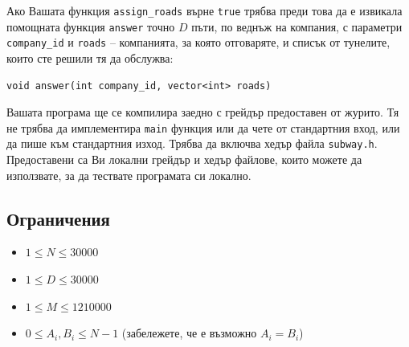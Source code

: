 \documentclass[12pt]{article}
\begin{document}
Ако Вашата функция \verb|assign_roads| върне \verb|true| трябва преди това да е извикала помощната функция \verb|answer| точно $D$ пъти, по веднъж на компания, с параметри \verb|company_id| и \verb|roads| -- компанията, за която отговаряте, и списък от тунелите, които сте решили тя да обслужва:

\begin{verbatim}
void answer(int company_id, vector<int> roads)
\end{verbatim}

Вашата програма ще се компилира заедно с грейдър предоставен от журито. Тя не трябва да имплементира \verb|main| функция или да чете от стандартния вход, или да пише към стандартния изход. Трябва да включва хедър файла \verb|subway.h|. Предоставени са Ви локални грейдър и хедър файлове, които можете да използвате, за да тествате програмата си локално.

\subsection{Ограничения}
\begin{itemize}
\item $1 \leq N \leq 30000$
\item $1 \leq D \leq 30000$
\item $1 \leq M \leq 1210000$
\item $0 \leq A_i, B_i \leq N - 1$ (забележете, че е възможно $A_i = B_i$)
\end{itemize}
\end{document}
